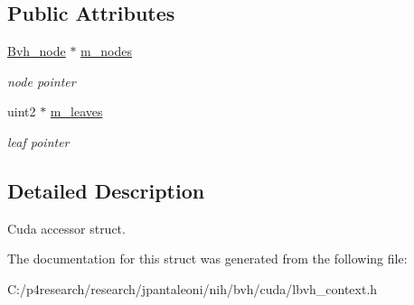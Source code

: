 \subsection*{\-Public \-Attributes}
\begin{DoxyCompactItemize}
\item 
\hypertarget{structnih_1_1cuda_1_1_l_b_v_h__context_1_1_context_ab76a1346e3cb93f5361820cd7404261c}{
\hyperlink{structnih_1_1_bvh__node}{\-Bvh\-\_\-node} $\ast$ \hyperlink{structnih_1_1cuda_1_1_l_b_v_h__context_1_1_context_ab76a1346e3cb93f5361820cd7404261c}{m\-\_\-nodes}}
\label{structnih_1_1cuda_1_1_l_b_v_h__context_1_1_context_ab76a1346e3cb93f5361820cd7404261c}

\begin{DoxyCompactList}\small\item\em node pointer \end{DoxyCompactList}\item 
\hypertarget{structnih_1_1cuda_1_1_l_b_v_h__context_1_1_context_a1ef407bbbfb375bd9bcb48596e558598}{
uint2 $\ast$ \hyperlink{structnih_1_1cuda_1_1_l_b_v_h__context_1_1_context_a1ef407bbbfb375bd9bcb48596e558598}{m\-\_\-leaves}}
\label{structnih_1_1cuda_1_1_l_b_v_h__context_1_1_context_a1ef407bbbfb375bd9bcb48596e558598}

\begin{DoxyCompactList}\small\item\em leaf pointer \end{DoxyCompactList}\end{DoxyCompactItemize}


\subsection{\-Detailed \-Description}
\-Cuda accessor struct. 

\-The documentation for this struct was generated from the following file\-:\begin{DoxyCompactItemize}
\item 
\-C\-:/p4research/research/jpantaleoni/nih/bvh/cuda/lbvh\-\_\-context.\-h\end{DoxyCompactItemize}
